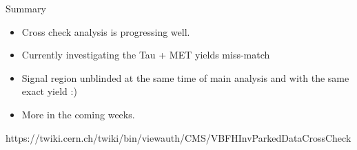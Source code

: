 \documentclass[8pt]{beamer}
\begin{document}
\begin{frame}{Summary}

\begin{itemize}
  \item Cross check analysis is progressing well.
  \item Currently investigating the Tau + MET yields miss-match 
  \item Signal region unblinded at the same time of main analysis and with the same exact yield :)
  \item More in the coming weeks.
\end{itemize}

\begin{center}
https://twiki.cern.ch/twiki/bin/viewauth/CMS/VBFHInvParkedDataCrossCheck
\end{center}

\end{frame}
\end{document}
